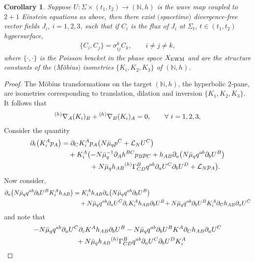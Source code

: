 \documentclass[11pt]{article}
\numberwithin{equation}{section}
\def\ptl{\partial}%
\def\grad{{\nabla}}%
\newcommand{\leftexp}[2]{{\vphantom{#2}}^{#1}{#2}}
\numberwithin{equation}{section}
\newtheorem{Corollary}[Theorem]{Corollary}
\begin{document}
\begin{Corollary}
Suppose $U\colon \Sigma \times (t_1, t_2) \to (\mathbb{N}, h)$ is the wave map coupled to $2 + 1$ Einstein equations as above,
then there exist $($spacetime$)$ divergence-free vector fields $J_i$, $i =1, 2, 3$, such that if $C_i$ is the flux of $J_i$ at $\Sigma_t$, $t \in (t_1, t_2)$ hypersurface,
\begin{align*}
\{C_i, C_j \} = \sigma^{k}_{ij} C_k, \qquad i\neq j \neq k,
\end{align*}
where $\{ \cdot, \cdot \}$ is the Poisson bracket in the phase space $X_{{\rm EWM}}$ and  are the structure constants of the $($M\"obius$)$ isometries $\{ K_i, K_2, K_3\}$ of $(\mathbb{N}, h)$.
\end{Corollary}
\begin{proof}
The M\"obius transformations on the target $(\mathbb{N}, h)$, the hyperbolic 2-pane, are isometries corresponding to translation, dilation and inversion $\{ K_1, K_2, K_3 \}$. It follows that
\begin{align*}
\leftexp{(h)}{\grad}_A (K_i)_B + \leftexp{(h)}{\grad}_B (K_i)_A =0, \qquad \forall \ i = 1, 2, 3,
\end{align*}
Consider the quantity
\begin{align*}
\ptl_t \bigl(K^A_i p_A\bigr) &{}= \ptl_C K_i^A p_A \bigl(N \bar{\mu}_q p^C + \mathcal{L}_N U^C\bigr) \notag\\
&\quad{}+ K_i^A \bigl(-N \bar{\mu}^{-1}_q \ptl_A h^{BC} p_B p_C
+ h_{AB} \ptl_a \bigl(N \bar{\mu}_q q^{ab} \ptl_b U^B\bigr) \notag\\
&\quad\hphantom{+ K_i^A \bigl(\ }{}+ N \bar{\mu}_q h_{AB} \leftexp{(h)}{\Gamma}^B_{CD} q^{ab} \ptl_a U^C \ptl_b U^D + \mathcal{L}_N p_A \bigr).
\end{align*}
Now consider,
\begin{align*}
\ptl_a \bigl(N \bar{\mu}_q q^{ab} \ptl_b U^B K_i^A h_{AB}\bigr) &{}= K_i^A h_{AB} \ptl_a \bigl(N \bar{\mu}_q q^{ab} \ptl_b U^B\bigr) \notag\\
&\quad{}+ N \bar{\mu}_q q ^{ab} \ptl_a U^C \ptl_c K_i^A h_{AB} \ptl_b U^B\!
+ N \bar{\mu}_q q^{ab} \ptl_b U^B K_i^A \ptl_C h_{AB} \ptl_a U^C
\end{align*}
and note that
\begin{gather*}
 -N \bar{\mu}_q q ^{ab} \ptl_a U^C \ptl_c K^A h_{AB} \ptl_b U^B - N \bar{\mu}_q q^{ab} \ptl_b U^B K^A \ptl_C h_{AB} \ptl_a U^C \\
\quad{} + N \bar{\mu}_q h_{AB} \leftexp{(h)}{\Gamma}^B_{CD} q^{ab} \ptl_a U^C \ptl_b U^D K_i^A \\

\end{gather*}
\end{proof}
\end{document}
